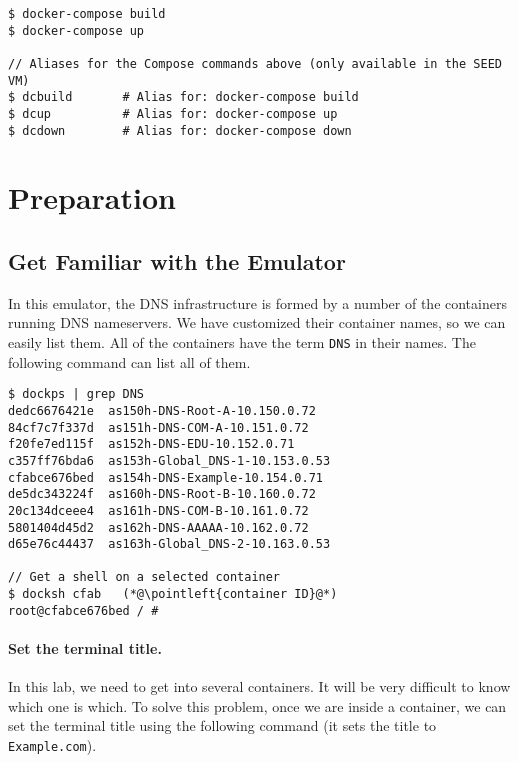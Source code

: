 \begin{lstlisting}
$ docker-compose build
$ docker-compose up

// Aliases for the Compose commands above (only available in the SEED VM)
$ dcbuild       # Alias for: docker-compose build
$ dcup          # Alias for: docker-compose up
$ dcdown        # Alias for: docker-compose down
\end{lstlisting}








\section{Preparation}




\subsection{Get Familiar with the Emulator} 

In this emulator, the DNS infrastructure is formed 
by a number of the containers running DNS nameservers. 
We have customized their container names, so we can easily
list them. All of the containers have the term
\texttt{DNS} in their names. The following command 
can list all of them. 

\begin{lstlisting}
$ dockps | grep DNS
dedc6676421e  as150h-DNS-Root-A-10.150.0.72
84cf7c7f337d  as151h-DNS-COM-A-10.151.0.72
f20fe7ed115f  as152h-DNS-EDU-10.152.0.71
c357ff76bda6  as153h-Global_DNS-1-10.153.0.53
cfabce676bed  as154h-DNS-Example-10.154.0.71
de5dc343224f  as160h-DNS-Root-B-10.160.0.72
20c134dceee4  as161h-DNS-COM-B-10.161.0.72
5801404d45d2  as162h-DNS-AAAAA-10.162.0.72
d65e76c44437  as163h-Global_DNS-2-10.163.0.53

// Get a shell on a selected container
$ docksh cfab   (*@\pointleft{container ID}@*) 
root@cfabce676bed / #
\end{lstlisting}


\paragraph{Set the terminal title.} In this lab,
we need to get into several containers. It will be very difficult 
to know which one is which. To solve this problem, once we 
are inside a container, we can set the terminal title using the 
following command (it sets the title to \texttt{Example.com}). 

